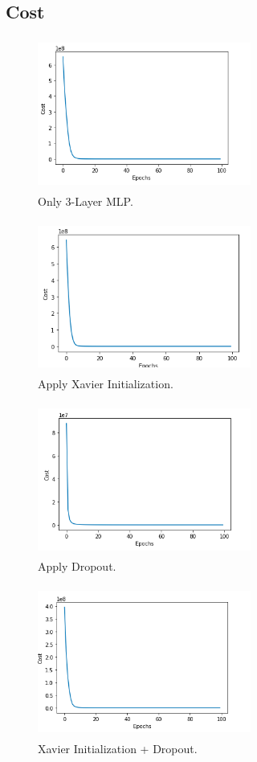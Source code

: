 \documentclass[conference]{IEEEtran}
\begin{document}
\subsection{Cost}
\begin{figure}[htbp]
\centerline{\includegraphics[width=7cm, height=5cm]{3-cost.png}}
\caption{Only 3-Layer MLP.}
\label{cost}
\end{figure}
\begin{figure}[htbp]
\centerline{\includegraphics[width=7cm, height=5cm]{3-xav-cost.png}}
\caption{Apply Xavier Initialization.}
\label{cost_xav}
\end{figure}
\begin{figure}[htbp]
\centerline{\includegraphics[width=7cm, height=5cm]{3-drop-cost.png}}
\caption{Apply Dropout.}
\label{cost_dropout}
\end{figure}
\newpage
\begin{figure}[htbp]
\centerline{\includegraphics[width=7cm, height=5cm]{3-all-cost.png}}
\caption{Xavier Initialization + Dropout.}
\label{cost_all}
\end{figure}
\end{document}
